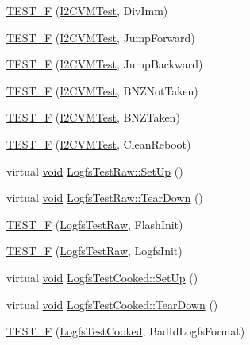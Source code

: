 \begin{DoxyCompactItemize}
\item 
\hyperlink{group___unit_tests_ga90e589865b97c8090278acc057a5aa19}{T\-E\-S\-T\-\_\-\-F} (\hyperlink{class_i2_c_v_m_test}{I2\-C\-V\-M\-Test}, Div\-Imm)
\item 
\hyperlink{group___unit_tests_ga4eab1e697b804d9a3dd9e4f5ee823335}{T\-E\-S\-T\-\_\-\-F} (\hyperlink{class_i2_c_v_m_test}{I2\-C\-V\-M\-Test}, Jump\-Forward)
\item 
\hyperlink{group___unit_tests_ga0a2a0cd2cb3be12cfe7bd67968a819ae}{T\-E\-S\-T\-\_\-\-F} (\hyperlink{class_i2_c_v_m_test}{I2\-C\-V\-M\-Test}, Jump\-Backward)
\item 
\hyperlink{group___unit_tests_ga7b4336a0da271403b044b8293bd54169}{T\-E\-S\-T\-\_\-\-F} (\hyperlink{class_i2_c_v_m_test}{I2\-C\-V\-M\-Test}, B\-N\-Z\-Not\-Taken)
\item 
\hyperlink{group___unit_tests_ga84f66a747de5db897d49e1cfa0305685}{T\-E\-S\-T\-\_\-\-F} (\hyperlink{class_i2_c_v_m_test}{I2\-C\-V\-M\-Test}, B\-N\-Z\-Taken)
\item 
\hyperlink{group___unit_tests_ga56ccd9fbaa7cdef0485f6a89c4d700c3}{T\-E\-S\-T\-\_\-\-F} (\hyperlink{class_i2_c_v_m_test}{I2\-C\-V\-M\-Test}, Clean\-Reboot)
\item 
virtual \hyperlink{group___n_a_m_e_ga18028b8badbf1ea7e704ccac3c488e82}{void} \hyperlink{group___unit_tests_ga6ad4da1f7c409b092a28457c4841e361}{Logfs\-Test\-Raw\-::\-Set\-Up} ()
\item 
virtual \hyperlink{group___n_a_m_e_ga18028b8badbf1ea7e704ccac3c488e82}{void} \hyperlink{group___unit_tests_ga14c567025394faab5c7628decc578f1f}{Logfs\-Test\-Raw\-::\-Tear\-Down} ()
\item 
\hyperlink{group___unit_tests_gad0ffad42b546bb80c39d04c4d69466f0}{T\-E\-S\-T\-\_\-\-F} (\hyperlink{class_logfs_test_raw}{Logfs\-Test\-Raw}, Flash\-Init)
\item 
\hyperlink{group___unit_tests_ga253b9e2c592f3b3754c532aeea4968d4}{T\-E\-S\-T\-\_\-\-F} (\hyperlink{class_logfs_test_raw}{Logfs\-Test\-Raw}, Logfs\-Init)
\item 
virtual \hyperlink{group___n_a_m_e_ga18028b8badbf1ea7e704ccac3c488e82}{void} \hyperlink{group___unit_tests_gafefb90c56c5d60e99e716775a5e60028}{Logfs\-Test\-Cooked\-::\-Set\-Up} ()
\item 
virtual \hyperlink{group___n_a_m_e_ga18028b8badbf1ea7e704ccac3c488e82}{void} \hyperlink{group___unit_tests_gab1ca9799c18f4944962a0e5b88ca8c9d}{Logfs\-Test\-Cooked\-::\-Tear\-Down} ()
\item 
\hyperlink{group___unit_tests_gaa95ae577174d8bd9b9cc50f39e1e4cf3}{T\-E\-S\-T\-\_\-\-F} (\hyperlink{class_logfs_test_cooked}{Logfs\-Test\-Cooked}, Bad\-Id\-Logfs\-Format)

\end{DoxyCompactItemize}
